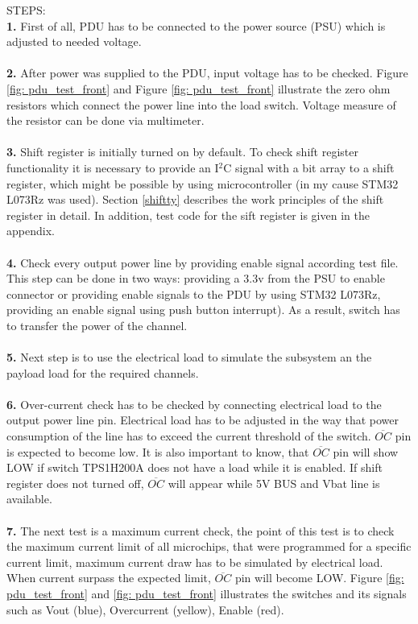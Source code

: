 STEPS:\\
\textbf{1.}  First of all, PDU has to be connected to the power source (PSU) which is adjusted to needed voltage.\\ \\
\textbf{2.} After power was supplied to the PDU, input voltage has to be checked. Figure \ref{fig: pdu_test_front} and Figure \ref{fig: pdu_test_front} illustrate the zero ohm resistors which connect the power line into the load switch. Voltage measure of the resistor can be done via multimeter. \\ \\
\textbf{3.} Shift register is initially turned on by default. To check shift register functionality it is necessary to provide an I$^2$C signal with a bit array to a shift register, which might be possible by using microcontroller (in my cause STM32 L073Rz was used). Section \ref{shiftty} describes the work principles of the shift register in detail. In addition, test code for the sift register is given in the appendix. \\ \\
\textbf{4.} Check every output power line by providing enable signal according test file. This step can be done in two ways: providing a 3.3v from the PSU to enable connector or providing
enable signals to the PDU by using STM32 L073Rz, providing an enable signal using push button interrupt). As a result, switch has to transfer the power of the channel.\\ \\
\textbf{5.} Next step is to use the electrical load to simulate the subsystem an the payload load for the required channels.\\ \\
\textbf{6.} Over-current check has to be checked by connecting electrical load to the output power line
pin. Electrical load has to be adjusted in the way that power consumption of the line has to exceed the current
threshold of the switch. $\overline{OC}$ pin is expected to become low.
It is also important to know, that $\overline{OC}$ pin will show LOW if switch TPS1H200A does not have a load while it is enabled. If shift register does not turned off, $\overline{OC}$ will appear while 5V BUS and Vbat line is available.\\ \\
\textbf{7.} The next test is a maximum current check, the point of this test is to check the maximum current limit of all microchips, that were programmed for a
specific current limit, maximum current draw has to be simulated by electrical load. When current surpass the expected
limit, $\overline{OC}$ pin will become LOW.
Figure \ref{fig: pdu_test_front} and \ref{fig: pdu_test_front} illustrates the switches and its signals such as Vout (blue), Overcurrent (yellow), Enable (red).

